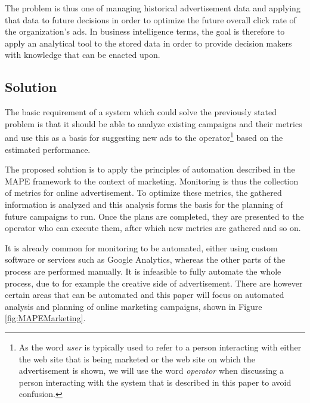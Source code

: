 \documentclass{sig-alternate}
\begin{document}
The problem is thus one of managing historical advertisement data and applying that data to future decisions in order to optimize the future overall click rate of the organization's ads. In business intelligence terms, the goal is therefore to apply an analytical tool to the stored data in order to provide decision makers with knowledge that can be enacted upon.

\subsection{Solution}
The basic requirement of a system which could solve the previously stated problem is that it should be able to analyze existing campaigns and their metrics and use this as a basis for suggesting new ads to the operator\footnote{As the word \emph{user} is typically used to refer to a person interacting with either the web site that is being marketed or the web site on which the advertisement is shown, we will use the word \emph{operator} when discussing a person interacting with the system that is described in this paper to avoid confusion.} based on the estimated performance.

The proposed solution is to apply the principles of automation described in the MAPE framework to the context of marketing. Monitoring is thus the collection of metrics for online advertisement. To optimize these metrics, the gathered information is analyzed and this analysis forms the basis for the planning of future campaigns to run. Once the plans are completed, they are presented to the operator who can execute them, after which new metrics are gathered and so on.

It is already common for monitoring to be automated, either using custom software or services such as Google Analytics, whereas the other parts of the process are performed manually. It is infeasible to fully automate the whole process, due to for example the creative side of advertisement. There are however certain areas that can be automated and this paper will focus on automated analysis and planning of online marketing campaigns, shown in Figure \ref{fig:MAPEMarketing}.
\end{document}
